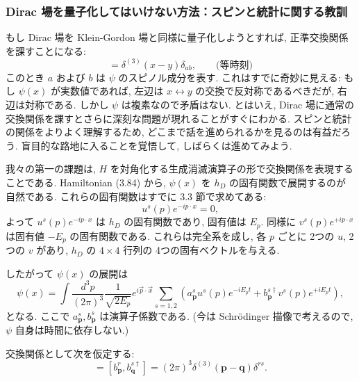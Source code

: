 \documentclass[a4paper,12pt]{article}
\begin{document}
\subsubsection*{Dirac 場を量子化してはいけない方法：スピンと統計に関する教訓}

もし Dirac 場を Klein-Gordon 場と同様に量子化しようとすれば, 正準交換関係を課すことになる:
\begin{equation}
[\psi_a(x), \psi_b^\dagger(y)] = \delta^{(3)}(x-y)\delta_{ab}, 
\qquad \text{(等時刻)} 
\tag{3.86}
\end{equation}
このとき $a$ および $b$ は $\psi$ のスピノル成分を表す.  
これはすでに奇妙に見える: もし $\psi(x)$ が実数値であれば, 左辺は $x \leftrightarrow y$ の交換で反対称であるべきだが, 右辺は対称である. しかし $\psi$ は複素なので矛盾はない. とはいえ, Dirac 場に通常の交換関係を課すとさらに深刻な問題が現れることがすぐにわかる.  
スピンと統計の関係をよりよく理解するため, どこまで話を進められるかを見るのは有益だろう. 盲目的な路地に入ることを覚悟して, しばらくは進めてみよう.  

我々の第一の課題は, $H$ を対角化する生成消滅演算子の形で交換関係を表現することである. Hamiltonian (3.84) から, $\psi(x)$ を $h_D$ の固有関数で展開するのが自然である. これらの固有関数はすでに 3.3 節で求めてある:
\begin{equation}
[i\gamma^0\partial_0 + i\gamma \cdot \nabla - m]u^s(p)e^{-ip\cdot x} = 0 ,
\end{equation}
よって $u^s(p)e^{-ip\cdot x}$ は $h_D$ の固有関数であり, 固有値は $E_p$. 同様に $v^s(p)e^{+ip\cdot x}$ は固有値 $-E_p$ の固有関数である. これらは完全系を成し, 各 $p$ ごとに 2つの $u$, 2つの $v$ があり, $h_D$ の $4\times4$ 行列の 4つの固有ベクトルを与える.

したがって $\psi(x)$ の展開は
\begin{equation}
\psi(x) = \int \frac{d^3p}{(2\pi)^3}\frac{1}{\sqrt{2E_p}} e^{i\vec{p}\cdot\vec{x}} 
\sum_{s=1,2} \left( a^s_{\mathbf{p}} u^s(p)e^{-iE_pt} + b^{s\dagger}_{\mathbf{p}} v^s(p)e^{+iE_pt} \right),
\tag{3.87}
\end{equation}
となる. ここで $a^s_{\mathbf{p}}, b^s_{\mathbf{p}}$ は演算子係数である. (今は Schr\"odinger 描像で考えるので, $\psi$ 自身は時間に依存しない.)  

交換関係として次を仮定する:
\begin{equation}
[a^r_{\mathbf{p}}, a^{s\dagger}_{\mathbf{q}}] = [b^r_{\mathbf{p}}, b^{s\dagger}_{\mathbf{q}}] 
= (2\pi)^3 \delta^{(3)}(\mathbf{p}-\mathbf{q}) \delta^{rs}.
\tag{3.88}
\end{equation}
\end{document}
